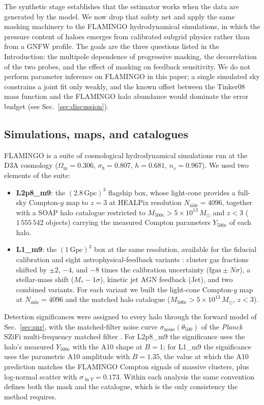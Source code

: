 \documentclass[aps,prd,twocolumn,superscriptaddress,nofootinbib,floatfix]{revtex4-2}
\begin{document}
The synthetic stage establishes that the estimator works when the data are generated by the model.
We now drop that safety net and apply the same masking machinery to the FLAMINGO hydrodynamical simulations, in which the pressure content of haloes emerges from calibrated subgrid physics rather than from a GNFW profile.
The goals are the three questions listed in the Introduction: the multipole dependence of progressive masking, the decorrelation of the two probes, and the effect of masking on feedback sensitivity.
We do not perform parameter inference on FLAMINGO in this paper; a single simulated sky constrains a joint fit only weakly, and the known offset between the Tinker08 mass function and the FLAMINGO halo abundance would dominate the error budget (see Sec.~\ref{sec:discussion}).

\subsection{Simulations, maps, and catalogues}
\label{sec:flamingo_data}

FLAMINGO \citep{Schaye2023,Kugel2023} is a suite of cosmological hydrodynamical simulations run at the D3A cosmology ($\Omega_{\mathrm{m}} = 0.306$, $\sigma_8 = 0.807$, $h = 0.681$, $n_s = 0.967$).
We used two elements of the suite:
\begin{itemize}
    \item \textbf{L2p8\_m9}: the $(2.8\,\mathrm{Gpc})^3$ flagship box, whose light-cone provides a full-sky Compton-$y$ map to $z = 3$ at HEALPix resolution $N_{\mathrm{side}} = 4096$, together with a SOAP halo catalogue restricted to $M_{500\mathrm{c}} > 5 \times 10^{13}\, M_\odot$ and $z < 3$ ($1\,555\,542$ objects) carrying the measured Compton parameters $Y_{500\mathrm{c}}$ of each halo.
    \item \textbf{L1\_m9}: the $(1\,\mathrm{Gpc})^3$ box at the same resolution, available for the fiducial calibration and eight astrophysical-feedback variants \citep{Kugel2023}: cluster gas fractions shifted by $\pm 2$, $-4$, and $-8$ times the calibration uncertainty ($\mathrm{fgas} \pm N\sigma$), a stellar-mass shift ($M_* - 1\sigma$), kinetic jet AGN feedback (Jet), and two combined variants.
    For each variant we built the light-cone Compton-$y$ map at $N_{\mathrm{side}} = 4096$ and the matched halo catalogue ($M_{500\mathrm{c}} > 5 \times 10^{13}\, M_\odot$, $z < 3$).
\end{itemize}
Detection significances were assigned to every halo through the forward model of Sec.~\ref{sec:snr}, with the matched-filter noise curve $\sigma_{\mathrm{noise}}(\theta_{500})$ of the \textit{Planck} SZiFi multi-frequency matched filter \citep{Zubeldia2024b}.
For L2p8\_m9 the significance uses the halo's measured $Y_{500\mathrm{c}}$ with the A10 shape at $B = 1$; for L1\_m9 the significance uses the parametric A10 amplitude with $B = 1.35$, the value at which the A10 prediction matches the FLAMINGO Compton signals of massive clusters, plus log-normal scatter with $\sigma_{\ln Y} = 0.173$.
Within each analysis the same convention defines both the mask and the catalogue, which is the only consistency the method requires.
\end{document}
